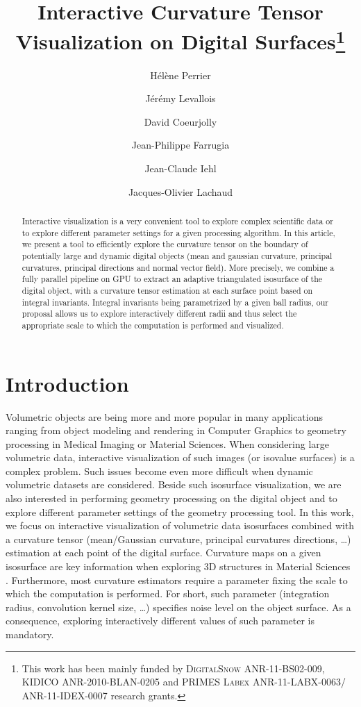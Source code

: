\documentclass{llncs}
\title{Interactive Curvature Tensor Visualization on Digital
Surfaces\thanks{This work has been mainly funded by \textsc{DigitalSnow}
ANR-11-BS02-009, \textsc{KIDICO} ANR-2010-BLAN-0205 and \textsc{PRIMES Labex}
ANR-11-LABX-0063/ ANR-11-IDEX-0007 research grants.}}
\author{H\'el\`ene Perrier\inst{1}\and J\'er\'emy Levallois\inst{1,2}\and David
Coeurjolly\inst{1}\and Jean-Philippe Farrugia\inst{1}\and Jean-Claude
Iehl\inst{1}\and Jacques-Olivier Lachaud\inst{2} }
\institute{ Universit\'e de Lyon, CNRS\\
   LIRIS, UMR5205, F-69621, France
   \and
Universit\'e de Savoie, CNRS\\
LAMA, UMR5127, F-73776, France\\
}
\begin{document}
\maketitle


\begin{abstract}\sloppy
  Interactive visualization is a very convenient tool to explore
  complex scientific data or to explore different parameter settings
  for a given processing algorithm. In this article, we present a tool
  to efficiently explore the curvature tensor on the boundary of
  potentially large and dynamic digital objects (mean and gaussian curvature,
  principal curvatures, principal directions and normal vector
  field). More precisely, we combine a fully parallel pipeline on GPU
  to extract an adaptive triangulated isosurface of the digital
  object, with a curvature tensor estimation at each surface point
  based on integral invariants. Integral invariants being parametrized
  by a given ball radius, our proposal allows us to explore
  interactively different radii and thus select the appropriate scale
  to which the computation is performed and visualized.

\end{abstract}

\section{Introduction}
\label{sec:introduction}

Volumetric objects are being more and more popular in many
applications ranging from object modeling and rendering in Computer
Graphics to geometry processing in Medical Imaging or Material
Sciences. When considering large volumetric data, interactive
visualization of such images (or isovalue surfaces) is a complex
problem. Such issues become even more difficult when dynamic
volumetric datasets are considered. Beside such isosurface
visualization, we are also interested in performing geometry
processing on the digital object and to explore different parameter
settings of the geometry processing tool.  In this work, we focus on
interactive visualization of volumetric data isosurfaces combined with
a curvature tensor (mean/Gaussian curvature, principal curvatures
directions, \ldots) estimation at each point of the digital
surface. Curvature maps on a given isosurface are key information when
exploring 3D structures in Material Sciences . Furthermore,
most curvature estimators require a parameter fixing the scale
to which the computation is performed. For short, such parameter
(integration radius, convolution kernel size, \ldots) specifies noise
level on the object surface. As a consequence, exploring interactively
different values of such parameter is mandatory.
\vspace{0.2cm}
\end{document}
